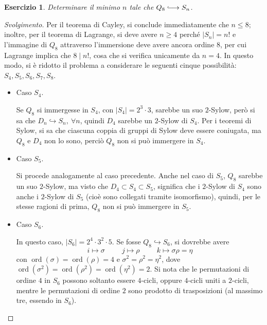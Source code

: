 \documentclass[11pt]{article}
\theoremstyle{style}
\newtheorem{esercizio}{Esercizio}[section]
\newenvironment{svolgimento}{\renewcommand\qedsymbol{$\blacksquare$}\begin{proof}[Svolgimento]}{\end{proof}}
\numberwithin{equation}{subsection}
\newcommand{\longhookrightarrow}{\lhook\joinrel\longrightarrow}
\begin{document}
\begin{esercizio}
Determinare il minimo $n$ tale che $ Q_8 \longhookrightarrow S_n$.
\end{esercizio}
\begin{svolgimento}
	Per il teorema di Cayley, si conclude immediatamente che $n\le 8$; inoltre, per il teorema di Lagrange, si deve avere $n \ge 4$ perch\'e $\lvert S_n \rvert  = n!$ e l'immagine di $Q_8$ attraverso l'immersione deve avere ancora ordine $8$, per cui Lagrange implica che $8  \mid  n!$, cosa che si verifica unicamente da $n = 4$.
	In questo modo, si \`e ridotto il problema a considerare le seguenti cinque possibilit\`a: $S_4,S_5,S_6,S_7,S_8$.
	\begin{itemize}
		\item Caso $S_4$.

			Se $Q_8$ si immergesse in $S_4$, con $\lvert S_4 \rvert =2^3 \cdot 3$, sarebbe un suo $2$-Sylow, per\`o si sa che $D_n \hookrightarrow S_n , \ \forall n$, quindi $D_4$ sarebbe un $2$-Sylow di $S_4$.
			Per i teoremi di Sylow, si sa che ciascuna coppia di gruppi di Sylow deve essere coniugata, ma $Q_8$ e $D_4$ non lo sono, perci\`o $Q_8$ non si pu\`o immergere in $S_4$.
		\item Caso $S_5$.

			Si procede analogamente al caso precedente.
			Anche nel caso di $S_5$, $Q_8$ sarebbe un suo $2$-Sylow, ma visto che $D_4 \subset S_4 \subset S_5$, significa che i $2$-Sylow di $S_4$ sono anche i $2$-Sylow di $S_5$ (cio\`e sono collegati tramite isomorfismo), quindi, per le stesse ragioni di prima, $Q_8$ non si pu\`o immergere in $S_5$.
		\item Caso $S_6$.

			In questo caso, $\lvert S_6 \rvert = 2^4 \cdot 3^2 \cdot 5$.
			Se fosse $Q_8\hookrightarrow S_6$, si dovrebbe avere 
			\[
			i\longmapsto \sigma  \hspace{1cm} j \longmapsto \rho  \hspace{1cm}k \longmapsto \sigma \rho  = \eta
			\] 
			con $\operatorname{ord}(\sigma ) =\operatorname{ord}(\rho ) =4$ e $\sigma ^2 = \rho ^2 = \eta^2$, dove $\operatorname{ord}(\sigma ^2) =\operatorname{ord}(\rho ^2) = \operatorname{ord}(\eta^2) = 2$.
			Si nota che le permutazioni di ordine $4$ in $S_6$ possono soltanto essere $4$-cicli, oppure $4$-cicli uniti a $2$-cicli, mentre le permutazioni di ordine $2$ sono prodotto di trasposizioni (al massimo tre, essendo in $S_6$).


\end{itemize}
\end{svolgimento}
\end{document}
